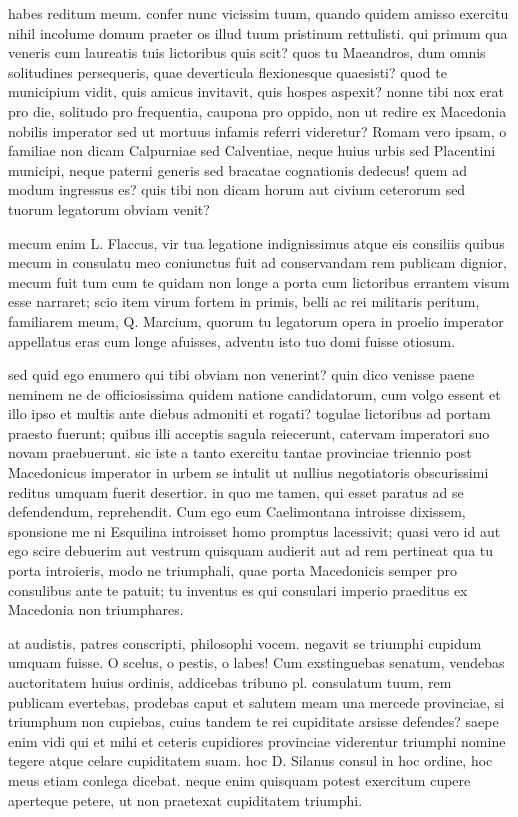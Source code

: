  habes reditum meum. confer nunc vicissim tuum, quando quidem amisso exercitu nihil incolume domum praeter os illud tuum pristinum rettulisti. qui primum qua veneris cum laureatis tuis lictoribus quis scit? quos tu Maeandros, dum omnis solitudines persequeris, quae deverticula flexionesque quaesisti? quod te municipium vidit, quis amicus invitavit, quis hospes aspexit? nonne tibi nox erat pro die, solitudo pro frequentia, caupona pro oppido, non ut redire ex Macedonia nobilis imperator sed ut mortuus infamis referri videretur? Romam vero ipsam, o familiae non dicam Calpurniae sed Calventiae, neque huius urbis sed Placentini municipi, neque paterni generis sed bracatae cognationis dedecus! quem ad modum ingressus es? quis tibi non dicam horum aut civium ceterorum sed tuorum legatorum obviam venit?

 mecum enim L. Flaccus, vir tua legatione indignissimus atque eis consiliis quibus mecum in consulatu meo coniunctus fuit ad conservandam rem publicam dignior, mecum fuit tum cum te quidam non longe a porta cum lictoribus errantem visum esse narraret; scio item virum fortem in primis, belli ac rei militaris peritum, familiarem meum, Q. Marcium, quorum tu legatorum opera in proelio imperator appellatus eras cum longe afuisses, adventu isto tuo domi fuisse otiosum.

 sed quid ego enumero qui tibi obviam non venerint? quin dico venisse paene neminem ne de officiosissima quidem natione candidatorum, cum volgo essent et illo ipso et multis ante diebus admoniti et rogati? togulae lictoribus ad portam praesto fuerunt; quibus illi acceptis sagula reiecerunt, catervam imperatori suo novam praebuerunt. sic iste a tanto exercitu tantae provinciae triennio post Macedonicus imperator in urbem se intulit ut nullius negotiatoris obscurissimi reditus umquam fuerit desertior. in quo me tamen, qui esset paratus ad se defendendum, reprehendit. Cum ego eum Caelimontana introisse dixissem, sponsione me ni Esquilina introisset homo promptus lacessivit; quasi vero id aut ego scire debuerim aut vestrum quisquam audierit aut ad rem pertineat qua tu porta introieris, modo ne triumphali, quae porta Macedonicis semper pro consulibus ante te patuit; tu inventus es qui consulari imperio praeditus ex Macedonia non triumphares.

 at audistis, patres conscripti, philosophi vocem. negavit se triumphi cupidum umquam fuisse. O scelus, o pestis, o labes! Cum exstinguebas senatum, vendebas auctoritatem huius ordinis, addicebas tribuno pl. consulatum tuum, rem publicam evertebas, prodebas caput et salutem meam una mercede provinciae, si triumphum non cupiebas, cuius tandem te rei cupiditate arsisse defendes? saepe enim vidi qui et mihi et ceteris cupidiores provinciae viderentur triumphi nomine tegere atque celare cupiditatem suam. hoc D. Silanus consul in hoc ordine, hoc meus etiam conlega dicebat. neque enim quisquam potest exercitum cupere aperteque petere, ut non praetexat cupiditatem triumphi.


